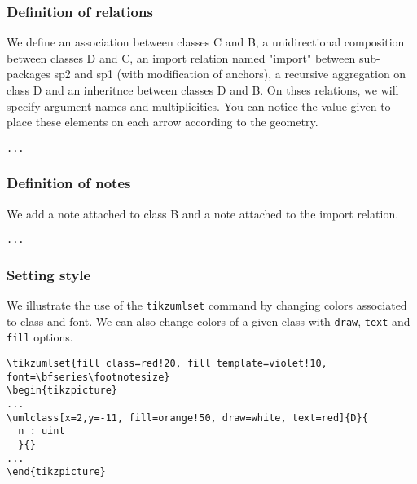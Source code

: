 \documentclass[a4paper,11pt]{report}
\newcommand{\inputTikZ}[1]{%
  }%
\newcommand{\inputTikZ}[1]{%
    \texttt{[image: fig/\#1.pdf]}%
  }%
\begin{document}
\subsubsection{Definition of relations}

We define an association between classes C and B, a unidirectional composition between classes D and C, an import relation named "import" between sub-packages sp2 and sp1 (with modification of anchors), a recursive aggregation on class D and an inheritnce between classes D and B. On thses relations, we will specify argument names and multiplicities. You can notice the value given to place 
these elements on each arrow according to the geometry.

\medskip

\hspace{-0.7cm}\lstinline{...}
{\color{red!70!black}

}

\begin{center}
\inputTikZ{classdiagstep3}
\end{center}

\subsubsection{Definition of notes}

We add a note attached to class B and a note attached to the import relation.

\medskip

\hspace{-0.7cm}\lstinline{...}
{\color{red!70!black}

}

\begin{center}
\inputTikZ{classdiagstep4}
\end{center}

\subsubsection{Setting style}

We illustrate the use of the {\tt tikzumlset} command by changing colors associated to class and font. 
We can also change colors of a given class with {\tt draw}, {\tt text} and {\tt fill} options.

\medskip

\begin{lstlisting}
\tikzumlset{fill class=red!20, fill template=violet!10, font=\bfseries\footnotesize}
\begin{tikzpicture}
...
\umlclass[x=2,y=-11, fill=orange!50, draw=white, text=red]{D}{
  n : uint
  }{}
...
\end{tikzpicture}
\end{lstlisting}
\end{document}
